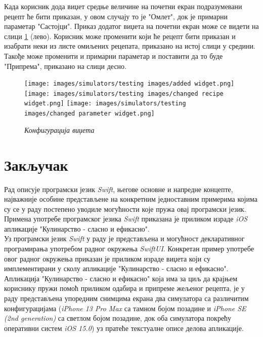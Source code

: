 \documentclass[12pt,oneside]{memoir}
\begin{document}

\indent Када корисник дода виџет средње величине на почетни екран подразумевани рецепт ће бити приказан, у овом случају то је "Омлет", док је примарни параметар "Састојци". Приказ додатог виџета на почетни екран може се видети на слици \ref{slika:приказ_конфигурације_виџета} (лево). Корисник може променити који ће рецепт бити приказан и изабрати неки из листе омиљених рецепата, приказано на истој слици у средини. Такође може променити и примарни параметар и поставити да то буде "Припрема", приказано на слици десно.

\begin{figure} [H]
    \centering
    \captionsetup{justification=centering}
    \texttt{[image: images/simulators/testing images/added widget.png]}
    \hfill
    \texttt{[image: images/simulators/testing images/changed recipe widget.png]}
    \hfill
    \texttt{[image: images/simulators/testing images/changed parameter widget.png]}
    \caption{\textit{Конфигурација виџета}}
    \label{slika:приказ_конфигурације_виџета}
\end{figure}

\chapter{Закључак}

\indent Рад описује програмски језик \textit{Swift}, његове основне и напредне концепте, најважније особине представљене на конкретним једноставним примерима којима су се у раду постепено уводиле могућности које пружа овај програмски језик. Примена употребе програмског језика \textit{Swift} приказана је приликом израде \textit{iOS} апликације "Кулинарство - сласно и ефикасно". 
\\
\indent Уз програмски језик \textit{Swift} у раду је представљена и могућност декларативног програмирања употребом радног окружења \textit{SwiftUI}. Конкретан пример употребе овог радног окружења приказан је приликом израде виџета који су имплементирани у сколу апликације "Кулинарство - сласно и ефикасно".
\\
\indent Апликација "Кулинарство - сласно и ефикасно" која има за циљ да крајњем кориснику пружи помоћ приликом одабира и припреме жељеног рецепта, је у раду представљена упоредним снимцима екрана два симулатора са различитим конфигурацијама (\textit{iPhone 13 Pro Max} са тамном бојом позадине и \textit{iPhone SE (2nd generation)} са светлом бојом позадине, док оба симулатора покрећу оперативни систем \textit{iOS 15.0}) уз пратеће текстуалне описе делова апликације. 
\\
\indent

\literatura
\end{document}
